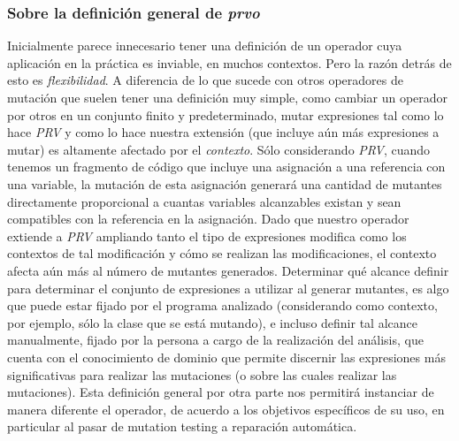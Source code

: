 \subsubsection{Sobre la definici\'on general de \emph{prvo}}
Inicialmente parece innecesario tener una definici\'on de un operador cuya aplicaci\'on en la pr\'actica es inviable, en muchos contextos. Pero la raz\'on detr\'as de esto es \emph{flexibilidad}. A diferencia de lo que sucede con otros operadores de mutaci\'on que suelen tener una definici\'on muy simple, como cambiar un operador por otros en un conjunto finito y predeterminado, mutar expresiones tal como lo hace \emph{PRV} y como lo hace nuestra extensi\'on (que incluye a\'un m\'as expresiones a mutar) es altamente afectado por el \emph{contexto}. S\'olo considerando \emph{PRV}, cuando tenemos un fragmento de c\'odigo que incluye una asignaci\'on a una referencia con una variable, la mutaci\'on de esta asignaci\'on generar\'a una cantidad de mutantes directamente proporcional a cuantas variables alcanzables existan y sean compatibles con la referencia en la asignaci\'on. Dado que nuestro operador extiende a \emph{PRV} ampliando tanto el tipo de expresiones modifica como los contextos de tal modificaci\'on y c\'omo se realizan las modificaciones, el contexto afecta a\'un m\'as al n\'umero de mutantes generados. Determinar qu\'e alcance definir para determinar el conjunto de expresiones a utilizar al generar mutantes, es algo que puede estar fijado por el programa analizado (considerando como contexto, por ejemplo, s\'olo la clase que se est\'a mutando), e incluso definir tal alcance manualmente, fijado por la persona a cargo de la realizaci\'on del an\'alisis, que cuenta con el conocimiento de dominio que permite discernir las expresiones m\'as significativas para realizar las mutaciones (o sobre las cuales realizar las mutaciones). Esta definici\'on general por otra parte nos permitir\'a instanciar de manera diferente el operador, de acuerdo a los objetivos espec\'ificos de su uso, en particular al pasar de mutation testing a reparaci\'on autom\'atica. 

